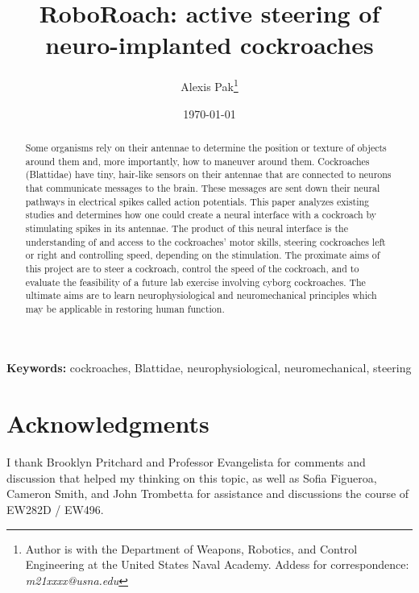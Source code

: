 \documentclass[10pt]{article}
\title{RoboRoach: active steering of neuro-implanted cockroaches}
\author{Alexis Pak\thanks{Author is with the Department of Weapons, Robotics, and Control Engineering at the United States Naval Academy. Addess for correspondence: \emph{m21xxxx@usna.edu}}}
\date{\today}
\begin{document}
\maketitle
\begin{abstract}
Some organisms rely on their antennae to determine the position or texture of objects around them and, more importantly, how to maneuver around them. Cockroaches (Blattidae) have tiny, hair-like sensors on their antennae that are connected to neurons that communicate messages to the brain. These messages are sent down their neural pathways in electrical spikes called action potentials. This paper analyzes existing studies and determines how one could create a neural interface with a cockroach by stimulating spikes in its antennae. The product of this neural interface is the understanding of and access to the cockroaches' motor skills, steering cockroaches left or right and controlling speed, depending on the stimulation. The proximate aims of this project are to steer a cockroach, control the speed of the cockroach, and to evaluate the feasibility of a future lab exercise involving cyborg cockroaches. The ultimate aims are to learn neurophysiological and neuromechanical principles which may be applicable in restoring human function. 
\end{abstract}
{\scriptsize\textbf{Keywords:} cockroaches, Blattidae, neurophysiological, neuromechanical, steering}





\section{Acknowledgments}
I thank Brooklyn Pritchard and Professor Evangelista for comments and discussion that helped my thinking on this topic, as well as Sofia Figueroa, Cameron Smith, and John Trombetta for assistance and discussions the course of EW282D / EW496.



\clearpage
\appendix 
\renewcommand{\figurename}{Supplementary Figure}
\renewcommand{\thefigure}{S\arabic{figure}}
\end{document}
